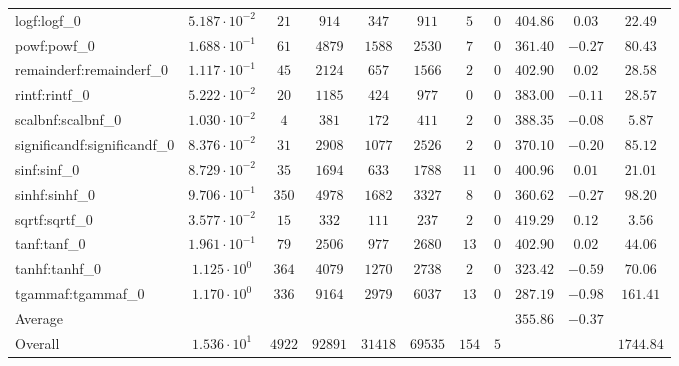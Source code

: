 \begin{tabular}{|l|c|c|c|c|c|c|c|c|c|c|}
logf:logf\_0                 & $ 5.187 \cdot 10^{-2} $ & $ 21     $ & $ 914   $ & $ 347   $ & $ 911   $ & $ 5   $ & $ 0 $ & $ 404.86      $ & $ 0.03    $ & $ 22.49   $ \\
powf:powf\_0                 & $ 1.688 \cdot 10^{-1} $ & $ 61     $ & $ 4879  $ & $ 1588  $ & $ 2530  $ & $ 7   $ & $ 0 $ & $ 361.40      $ & $ -0.27   $ & $ 80.43   $ \\
remainderf:remainderf\_0     & $ 1.117 \cdot 10^{-1} $ & $ 45     $ & $ 2124  $ & $ 657   $ & $ 1566  $ & $ 2   $ & $ 0 $ & $ 402.90      $ & $ 0.02    $ & $ 28.58   $ \\
rintf:rintf\_0               & $ 5.222 \cdot 10^{-2} $ & $ 20     $ & $ 1185  $ & $ 424   $ & $ 977   $ & $ 0   $ & $ 0 $ & $ 383.00      $ & $ -0.11   $ & $ 28.57   $ \\
scalbnf:scalbnf\_0           & $ 1.030 \cdot 10^{-2} $ & $ 4      $ & $ 381   $ & $ 172   $ & $ 411   $ & $ 2   $ & $ 0 $ & $ 388.35      $ & $ -0.08   $ & $ 5.87    $ \\
significandf:significandf\_0 & $ 8.376 \cdot 10^{-2} $ & $ 31     $ & $ 2908  $ & $ 1077  $ & $ 2526  $ & $ 2   $ & $ 0 $ & $ 370.10      $ & $ -0.20   $ & $ 85.12   $ \\
sinf:sinf\_0                 & $ 8.729 \cdot 10^{-2} $ & $ 35     $ & $ 1694  $ & $ 633   $ & $ 1788  $ & $ 11  $ & $ 0 $ & $ 400.96      $ & $ 0.01    $ & $ 21.01   $ \\
sinhf:sinhf\_0               & $ 9.706 \cdot 10^{-1} $ & $ 350    $ & $ 4978  $ & $ 1682  $ & $ 3327  $ & $ 8   $ & $ 0 $ & $ 360.62      $ & $ -0.27   $ & $ 98.20   $ \\
sqrtf:sqrtf\_0               & $ 3.577 \cdot 10^{-2} $ & $ 15     $ & $ 332   $ & $ 111   $ & $ 237   $ & $ 2   $ & $ 0 $ & $ 419.29      $ & $ 0.12    $ & $ 3.56    $ \\
tanf:tanf\_0                 & $ 1.961 \cdot 10^{-1} $ & $ 79     $ & $ 2506  $ & $ 977   $ & $ 2680  $ & $ 13  $ & $ 0 $ & $ 402.90      $ & $ 0.02    $ & $ 44.06   $ \\
tanhf:tanhf\_0               & $ 1.125 \cdot 10^{0}  $ & $ 364    $ & $ 4079  $ & $ 1270  $ & $ 2738  $ & $ 2   $ & $ 0 $ & $ 323.42      $ & $ -0.59   $ & $ 70.06   $ \\
tgammaf:tgammaf\_0           & $ 1.170 \cdot 10^{0}  $ & $ 336    $ & $ 9164  $ & $ 2979  $ & $ 6037  $ & $ 13  $ & $ 0 $ & $ 287.19      $ & $ -0.98   $ & $ 161.41  $ \\
\hline
Average                      & $                     $ & $        $ & $       $ & $       $ & $       $ & $     $ & $   $ & $ 355.86      $ & $ -0.37   $ & $         $ \\
\hline
Overall                      & $ 1.536 \cdot 10^{1}  $ & $ 4922   $ & $ 92891 $ & $ 31418 $ & $ 69535 $ & $ 154 $ & $ 5 $ & $             $ & $         $ & $ 1744.84 $ \\
\hline
\end{tabular}
